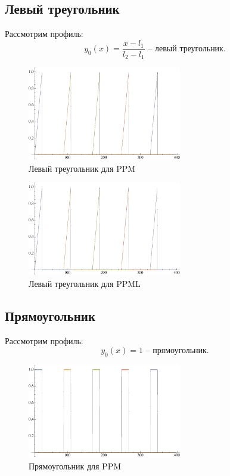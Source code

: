 \documentclass[12pt,a4paper]{article}
\begin{document}
    \subsection{Левый треугольник}
    Рассмотрим профиль:
    \[
        y_0(x) = \dfrac{x - l_1}{l_2 - l_1} \text{ -- левый треугольник}.
    \]
    
    \begin{figure}[h]
        \centering
        \includegraphics[width=0.6\textwidth]{c=1/h=1./advectionPPM_leftTriangle.pdf}
        \caption{Левый треугольник для PPM}
        \label{fig:ppm_leftTriangle}
    \end{figure}

    \begin{figure}[h]
        \centering
        \includegraphics[width=0.6\textwidth]{c=1/h=1./advectionPPML_leftTriangle.pdf}
        \caption{Левый треугольник для PPML}
        \label{fig:ppml_leftTriangle}
    \end{figure}

    \pagebreak

    \subsection{Прямоугольник}
    Рассмотрим профиль:
    \[
        y_0(x) = 1 \text{ -- прямоугольник}.
    \]
    
    \begin{figure}[h]
        \centering
        \includegraphics[width=0.6\textwidth]{c=1/h=1./advectionPPM_rectangle.pdf}
        \caption{Прямоугольник для PPM}
        \label{fig:ppm_rectangle}
    \end{figure}
\end{document}
